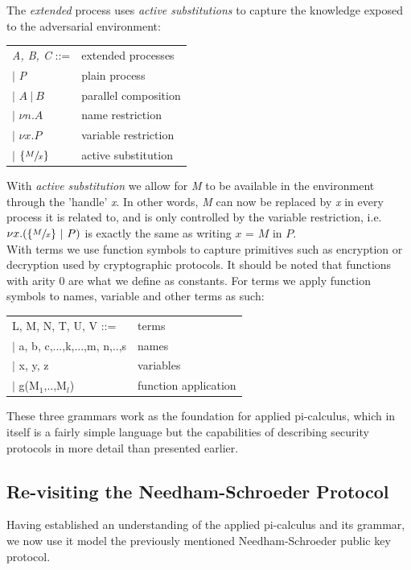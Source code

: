 \noindent The \textit{extended} process uses \textit{active substitutions} to capture the knowledge exposed to the
adversarial environment: 
\begin{center}
	\begin{tabular} { l l }
 		\textit{A, B, C} ::= & extended processes \\ 
 		\quad $|$ \textit{P} & plain process \\  
 		\quad $|$ $A\ |\ B$ & parallel composition \\
		\quad $|$ $\nu n.A$ & name restriction \\
		\quad $|$ $\nu x.P$ & variable restriction \\
		\quad $|$ $\{ \sfrac{M}{x} \}$ & active substitution
	\end{tabular}
\end{center}
With \textit{active substitution} we allow for \textit{M} to be available in the environment through the 'handle' \textit{x}. In other words, \textit{M} can now be replaced by \textit{x} in every process it is related to, and is only controlled by the variable restriction, i.e. $\nu x.(\{\sfrac{M}{x}\}\ |\ P)$ is exactly the same as writing $x$ = $M$ in $P.$\\ 

\noindent With terms we use function symbols to capture primitives such as encryption or decryption used by cryptographic protocols. It should be noted that functions with arity 0 are what we define as constants.
For terms we apply function symbols to names, variable and other terms as such: 
\begin{center}
	\begin{tabular} { l l }
 		L, M, N, T, U, V ::= & terms \\ 
 		\quad $|$ a, b, c,...,k,...,m, n,..,s & names \\  
 		\quad $|$ x, y, z & variables \\
 		\quad $|$ g(M$_{1}$,..,M$_{l}$) & function application
	\end{tabular}
\end{center}
These three grammars work as the foundation for applied pi-calculus, which in itself is a fairly simple language but the capabilities of describing security protocols in more detail than presented earlier. 

\subsection{Re-visiting the Needham-Schroeder Protocol}
Having established an understanding of the applied pi-calculus and its grammar, we now use it model the previously mentioned Needham-Schroeder public key protocol.\\

